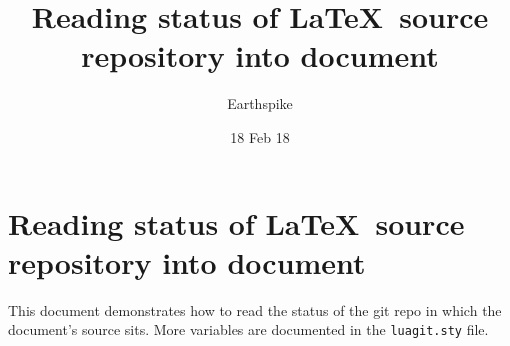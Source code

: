 \documentclass[a4paper]{article}
\title{Reading status of \LaTeX\ source repository into document}
\author{Earthspike}
\date{18 Feb 18}
\begin{document}
\begin{titlepage}
\maketitle
\end{titlepage}


\section{Reading status of \LaTeX\ source repository into document}

This document demonstrates how to read the status of the git repo in
which the document's source sits. More variables are documented in the
\verb|luagit.sty| file.

\end{document}
